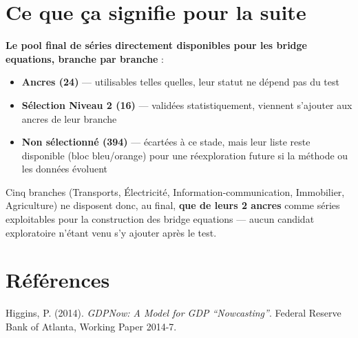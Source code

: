 \documentclass[11pt,a4paper]{article}
\begin{document}
\section{Ce que ça signifie pour la suite}

\begin{selectbox}
\textbf{Le pool final de séries directement disponibles pour les bridge equations, branche par branche} :
\begin{itemize}[leftmargin=1.3em]
\item \textbf{Ancres (24)} --- utilisables telles quelles, leur statut ne dépend pas du test
\item \textbf{Sélection Niveau 2 (16)} --- validées statistiquement, viennent s'ajouter aux ancres de leur branche
\item \textbf{Non sélectionné (394)} --- écartées à ce stade, mais leur liste reste disponible (bloc bleu/orange) pour une réexploration future si la méthode ou les données évoluent
\end{itemize}

Cinq branches (Transports, Électricité, Information-communication, Immobilier, Agriculture) ne disposent donc, au final, \textbf{que de leurs 2 ancres} comme séries exploitables pour la construction des bridge equations --- aucun candidat exploratoire n'étant venu s'y ajouter après le test.
\end{selectbox}

\section*{Références}
\begin{enumerate}[leftmargin=1.6em, label=\textbf{[\arabic*]}]
\item \hypertarget{ref1}{} Higgins, P. (2014). \textit{GDPNow: A Model for GDP ``Nowcasting''}. Federal Reserve Bank of Atlanta, Working Paper 2014-7.
\end{enumerate}
\end{document}
